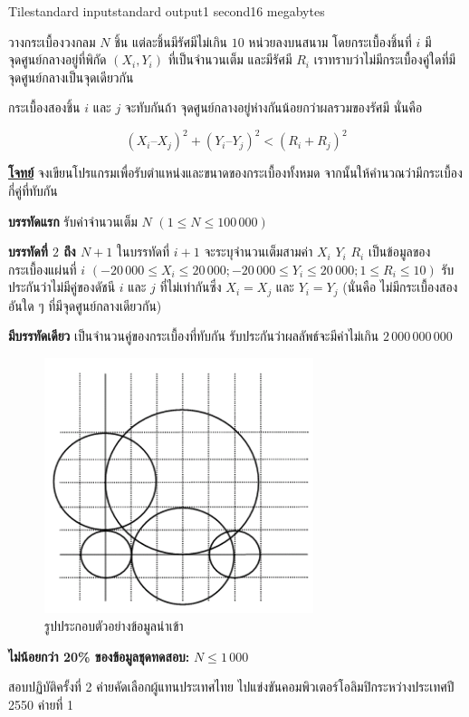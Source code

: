\documentclass[11pt,a4paper]{article}
\begin{document}
\begin{problem}{Tile}{standard input}{standard output}{1 second}{16 megabytes}

วางกระเบื้องวงกลม $N$  ชิ้น แต่ละชิ้นมีรัศมีไม่เกิน $10$ หน่วยลงบนสนาม  โดยกระเบื้องชิ้นที่ $i$ มีจุดศูนย์กลางอยู่ที่พิกัด $(X_i , Y_i)$  ที่เป็นจำนวนเต็ม และมีรัศมี $R_i$ เราทราบว่าไม่มีกระเบื้องคู่ใดที่มีจุดศูนย์กลางเป็นจุดเดียวกัน

กระเบื้องสองชิ้น $i$ และ $j$ จะทับกันถ้า จุดศูนย์กลางอยู่ห่างกันน้อยกว่าผลรวมของรัศมี  นั่นคือ

$$(X_i – X_j)^2 + (Y_i –Y_j)^2 < (R_i + R_j)^2$$

\bigskip
\underline{\textbf{โจทย์}}  จงเขียนโปรแกรมเพื่อรับตำแหน่งและขนาดของกระเบื้องทั้งหมด จากนั้นให้คำนวณว่ามีกระเบื้องกี่คู่ที่ทับกัน

\InputFile

\textbf{บรรทัดแรก} รับค่าจำนวนเต็ม $N$ $(1 \leq N \leq 100\,000)$   

\textbf{บรรทัดที่ $2$ ถึง $N +1$} ในบรรทัดที่ $i+1$ จะระบุจำนวนเต็มสามค่า $X_i$  $Y_i$  $R_i$ เป็นข้อมูลของกระเบื้องแผ่นที่ $i$  $(-20\,000 \leq X_i \leq 20\,000;  -20\,000 \leq Y_i \leq 20\,000; 1 \leq R_i \leq 10)$  รับประกันว่าไม่มีคู่ของดัชนี $i$ และ $j$ ที่ไม่เท่ากันซึ่ง $X_i = X_j$ และ $Y_i = Y_j$   (นั่นคือ ไม่มีกระเบื้องสองอันใด ๆ ที่มีจุดศูนย์กลางเดียวกัน)

\OutputFile

\textbf{มีบรรทัดเดียว} เป็นจำนวนคู่ของกระเบื้องที่ทับกัน รับประกันว่าผลลัพธ์จะมีค่าไม่เกิน $2\,000\,000\,000$

\Examples

\begin{example}
%
\end{example}

\Note 

\begin{figure}[h]
\centering
\includegraphics[width=0.7\textwidth]{../latex/img/1054/1054-1.png}
\caption{รูปประกอบตัวอย่างข้อมูลนำเข้า}
\end{figure}

\Scoring 

\textbf{ไม่น้อยกว่า 20\% ของข้อมูลชุดทดสอบ:} $N \leq 1\,000$

\Source

สอบปฏิบัติครั้งที่ 2 ค่ายคัดเลือกผู้แทนประเทศไทย ไปแข่งขันคอมพิวเตอร์โอลิมปิกระหว่างประเทศปี 2550 ค่ายที่ 1

\end{problem}
\end{document}
